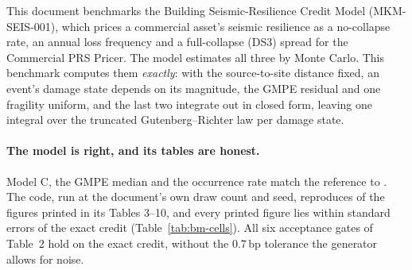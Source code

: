 \documentclass[11pt,a4paper]{article}
\begin{document}
\sloppy

\mkmtitlepage
\mkmlegalpage

\tableofcontents
\clearpage

\mkmexecsummary

This document benchmarks the Building Seismic-Resilience Credit Model
(MKM-SEIS-001), which prices a commercial asset's seismic resilience as a
no-collapse rate, an annual loss frequency and a full-collapse (DS3) spread for the
Commercial PRS Pricer. The model estimates all three by Monte Carlo. This benchmark
computes them \emph{exactly}: with the source-to-site distance fixed, an event's
damage state depends on its magnitude, the GMPE residual and one fragility uniform,
and the last two integrate out in closed form, leaving one integral over the
truncated Gutenberg--Richter law per damage state.

\paragraph{The model is right, and its tables are honest.} Model C, the GMPE median
and the occurrence rate match the reference to \bmCheckErr. The code, run at the
document's own draw count and seed, reproduces \bmReproduced{} of the \bmPrinted{}
figures printed in its Tables 3--10, and every printed figure lies within \bmWorstZ{}
standard errors of the exact credit (Table~\ref{tab:bm-cells}). All six acceptance
gates of Table~2 hold on the exact credit, without the 0.7\,bp tolerance the
generator allows for noise. \bmWolframConfirms
\end{document}

